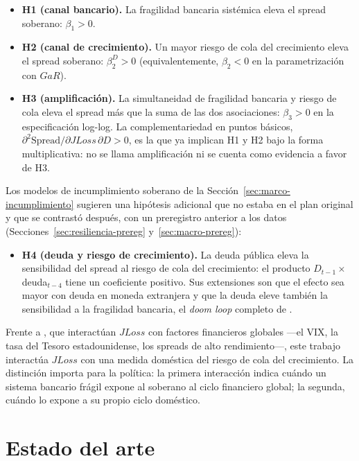 \begin{itemize}
    \item \textbf{H1 (canal bancario).} La fragilidad bancaria sistémica eleva el spread soberano: $\beta_1>0$.
    \item \textbf{H2 (canal de crecimiento).} Un mayor riesgo de cola del crecimiento eleva el spread soberano: $\beta_2^{D}>0$ (equivalentemente, $\beta_2<0$ en la parametrización con $GaR$).
    \item \textbf{H3 (amplificación).} La simultaneidad de fragilidad bancaria y riesgo de cola eleva el spread más que la suma de las dos asociaciones: $\beta_3>0$ en la especificación log-log. La complementariedad en puntos básicos, $\partial^2\mathrm{Spread}/\partial JLoss\,\partial D>0$, es la que ya implican H1 y H2 bajo la forma multiplicativa: no se llama amplificación ni se cuenta como evidencia a favor de H3.
\end{itemize}

Los modelos de incumplimiento soberano de la Sección~\ref{sec:marco-incumplimiento} sugieren una hipótesis adicional que no estaba en el plan original y que se contrastó después, con un preregistro anterior a los datos (Secciones~\ref{sec:resiliencia-prereg} y~\ref{sec:macro-prereg}):
\begin{itemize}
    \item \textbf{H4 (deuda y riesgo de crecimiento).} La deuda pública eleva la sensibilidad del spread al riesgo de cola del crecimiento: el producto $D_{t-1}\times$deuda$_{t-4}$ tiene un coeficiente positivo. Sus extensiones son que el efecto sea mayor con deuda en moneda extranjera y que la deuda eleve también la sensibilidad a la fragilidad bancaria, el \textit{doom loop} completo de \citet{FarhiTirole2018b}.
\end{itemize}

Frente a \citet{Chari2024b}, que interactúan $JLoss$ con factores financieros globales ---el VIX, la tasa del Tesoro estadounidense, los spreads de alto rendimiento---, este trabajo interactúa $JLoss$ con una medida doméstica del riesgo de cola del crecimiento. La distinción importa para la política: la primera interacción indica cuándo un sistema bancario frágil expone al soberano al ciclo financiero global; la segunda, cuándo lo expone a su propio ciclo doméstico.

\section{Estado del arte}
\label{sec:literatura}

